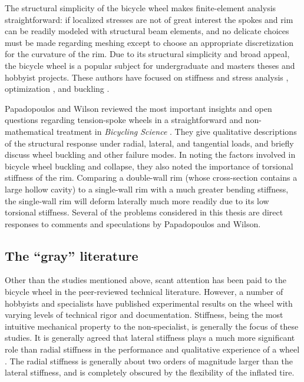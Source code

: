 \documentclass[../thesis.tex]{subfiles}
\begin{document}
The structural simplicity of the bicycle wheel makes finite-element analysis straightforward: if localized stresses are not of great interest the spokes and rim can be readily modeled with structural beam elements, and no delicate choices must be made regarding meshing except to choose an appropriate discretization for the curvature of the rim. Due to its structural simplicity and broad appeal, the bicycle wheel is a popular subject for undergraduate and masters theses and hobbyist projects. These authors have focused on stiffness and stress analysis \cite{Hartz2002,Ng2012}, optimization \cite{Keller2013,Svensson2015}, and buckling \cite{Kern2016}.

Papadopoulos and Wilson reviewed the most important insights and open questions regarding tension-spoke wheels in a straightforward and non-mathematical treatment in \emph{Bicycling Science} \cite{Wilson2004}. They give qualitative descriptions of the structural response under radial, lateral, and tangential loads, and briefly discuss wheel buckling and other failure modes. In noting the factors involved in bicycle wheel buckling and collapse, they also noted the importance of torsional stiffness of the rim. Comparing a double-wall rim (whose cross-section contains a large hollow cavity) to a single-wall rim with a much greater bending stiffness, the single-wall rim will deform laterally much more readily due to its low torsional stiffness. Several of the problems considered in this thesis are direct responses to comments and speculations by Papadopoulos and Wilson.


\subsection{The ``gray'' literature}

Other than the studies mentioned above, scant attention has been paid to the bicycle wheel in the peer-reviewed technical literature. However, a number of hobbyists and specialists have published experimental results on the wheel with varying levels of technical rigor and documentation. Stiffness, being the most intuitive mechanical property to the non-specialist, is generally the focus of these studies. It is generally agreed that lateral stiffness plays a much more significant role than radial stiffness in the performance and qualitative experience of a wheel \cite{Kopecky2013}. The radial stiffness is generally about two orders of magnitude larger than the lateral stiffness, and is completely obscured by the flexibility of the inflated tire.
\end{document}
